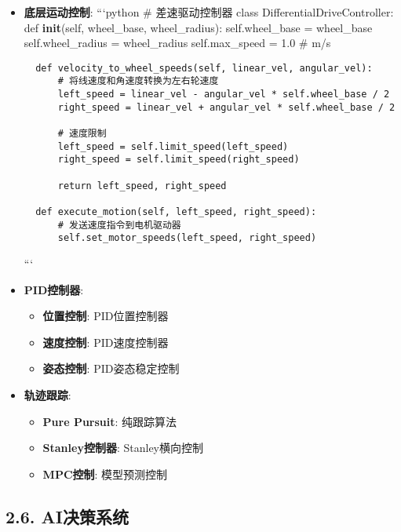 \begin{itemize}
\item
  \textbf{底层运动控制}: ```python \# 差速驱动控制器 class
  DifferentialDriveController: def \textbf{init}(self, wheel\_base,
  wheel\_radius): self.wheel\_base = wheel\_base self.wheel\_radius =
  wheel\_radius self.max\_speed = 1.0 \# m/s

\begin{lstlisting}
  def velocity_to_wheel_speeds(self, linear_vel, angular_vel):
      # 将线速度和角速度转换为左右轮速度
      left_speed = linear_vel - angular_vel * self.wheel_base / 2
      right_speed = linear_vel + angular_vel * self.wheel_base / 2

      # 速度限制
      left_speed = self.limit_speed(left_speed)
      right_speed = self.limit_speed(right_speed)

      return left_speed, right_speed

  def execute_motion(self, left_speed, right_speed):
      # 发送速度指令到电机驱动器
      self.set_motor_speeds(left_speed, right_speed)
\end{lstlisting}

  ```
\item
  \textbf{PID控制器}:

  \begin{itemize}
  \tightlist
  \item
    \textbf{位置控制}: PID位置控制器
  \item
    \textbf{速度控制}: PID速度控制器
  \item
    \textbf{姿态控制}: PID姿态稳定控制
  \end{itemize}
\item
  \textbf{轨迹跟踪}:

  \begin{itemize}
  \tightlist
  \item
    \textbf{Pure Pursuit}: 纯跟踪算法
  \item
    \textbf{Stanley控制器}: Stanley横向控制
  \item
    \textbf{MPC控制}: 模型预测控制
  \end{itemize}
\end{itemize}

\subsection{2.6. AI决策系统}\label{aiux51b3ux7b56ux7cfbux7edf}


